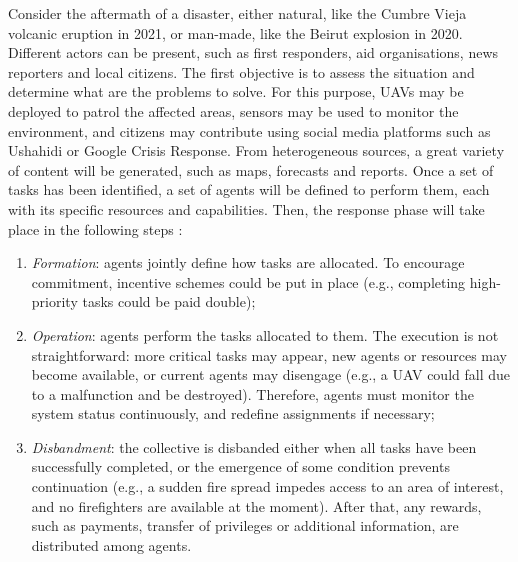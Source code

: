 Consider the aftermath of a disaster, either natural, like the Cumbre Vieja volcanic
eruption in 2021, or man-made, like the Beirut explosion in 2020. Different actors can be
present, such as first responders, aid organisations, news reporters and local citizens.
The first objective is to assess the situation and determine what are the problems to
solve. For this purpose, UAVs may be deployed to patrol the affected areas, sensors may be
used to monitor the environment, and citizens may contribute using social media platforms
such as Ushahidi \cite{ushahidi} or Google Crisis Response. From heterogeneous sources, a
great variety of content will be generated, such as maps, forecasts and reports. Once a
set of tasks has been identified, a set of agents will be defined to perform them, each
with its specific resources and capabilities. Then, the response phase will take place in
the following steps \cite{hac2014}:
\begin{enumerate}
    \item \emph{Formation}: agents jointly define how tasks are allocated. To encourage
        commitment, incentive schemes could be put in place (e.g., completing
        high-priority tasks could be paid double);
    \item \emph{Operation}: agents perform the tasks allocated to them. The execution is
        not straightforward: more critical tasks may appear, new agents or resources may
        become available, or current agents may disengage (e.g., a UAV could fall due to a
        malfunction and be destroyed). Therefore, agents must monitor the system status
        continuously, and redefine assignments if necessary;
    \item \emph{Disbandment}: the collective is disbanded either when all tasks have been
        successfully completed, or the emergence of some condition prevents continuation
        (e.g., a sudden fire spread impedes access to an area of interest, and no
        firefighters are available at the moment). After that, any rewards, such as
        payments, transfer of privileges or additional information, are distributed among
        agents.
\end{enumerate}


